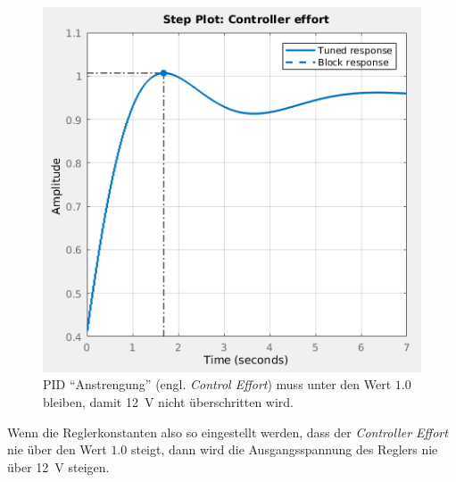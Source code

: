 \begin{figure}[H]
    \centering
    \includegraphics[width=\imagewidth]{images/controller_effort}
    \caption{PID ``Anstrengung'' (engl. \textit{Control Effort}) muss unter den Wert $1.0$ bleiben, damit \SI{12}{\volt} nicht \"uberschritten wird.}
    \label{fig:controller_effort}
\end{figure}

Wenn   die   Reglerkonstanten   also   so   eingestellt   werden,   dass   der
\textit{Controller Effort}  nie  \"uber  den  Wert $1.0$ steigt, dann wird die
Ausgangsspannung    des    Reglers    nie   \"uber   \SI{12}{\volt}   steigen.

